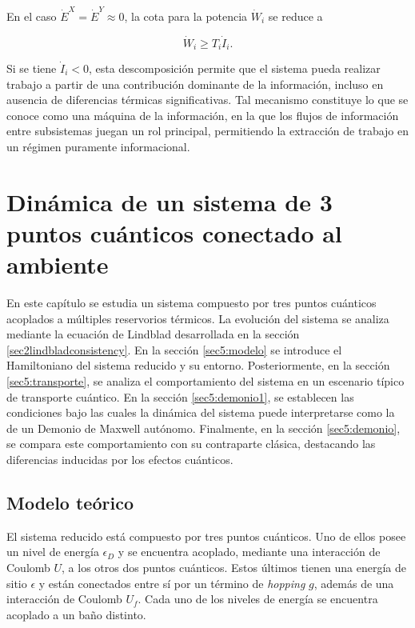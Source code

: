 En el caso $\dot{E}^{X} = \dot{E}^{Y} \approx 0 $, la cota para la potencia $\dot{W}_{i}$ se reduce a 

\begin{equation*}
     \dot{W}_{i} \geq T_{i}\dot{I}_{i}.
\end{equation*}

Si se tiene $\dot{I}_{i}<0$, esta descomposición permite que el sistema pueda realizar trabajo a partir de una contribución dominante de la información, incluso en ausencia de diferencias térmicas significativas. Tal mecanismo constituye lo que se conoce como una máquina de la información, en la que los flujos de información entre subsistemas juegan un rol principal, permitiendo la extracción de trabajo en un régimen puramente informacional.


\label{sec4:flujos0}

\chapter{Dinámica de un sistema de 3 puntos cuánticos conectado al ambiente}
En este capítulo se estudia un sistema compuesto por tres puntos cuánticos acoplados a múltiples reservorios térmicos. La evolución del sistema se analiza mediante la ecuación de Lindblad desarrollada en la sección \ref{sec2lindbladconsistency}. En la sección \ref{sec5:modelo} se introduce el Hamiltoniano del sistema reducido y su entorno. Posteriormente, en la sección \ref{sec5:transporte}, se analiza el comportamiento del sistema en un escenario típico de transporte cuántico. En la sección \ref{sec5:demonio1}, se establecen las condiciones bajo las cuales la dinámica del sistema puede interpretarse como la de un Demonio de Maxwell autónomo. Finalmente, en la sección \ref{sec5:demonio}, se compara este comportamiento con su contraparte clásica, destacando las diferencias inducidas por los efectos cuánticos.

\section{Modelo teórico}
El sistema reducido está compuesto por tres puntos cuánticos. Uno de ellos posee un nivel de energía $\epsilon_D$ y se encuentra acoplado, mediante una interacción de Coulomb $U$, a los otros dos puntos cuánticos. Estos últimos tienen una energía de sitio $\epsilon$ y están conectados entre sí por un término de \textit{hopping} $g$, además de una interacción de Coulomb $U_f$. Cada uno de los niveles de energía se encuentra acoplado a un baño distinto. 

